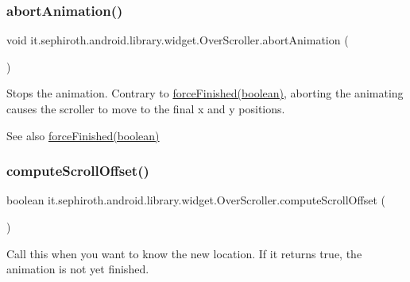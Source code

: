 \subsubsection{\texorpdfstring{abort\+Animation()}{abortAnimation()}}
{\footnotesize\ttfamily void it.\+sephiroth.\+android.\+library.\+widget.\+Over\+Scroller.\+abort\+Animation (\begin{DoxyParamCaption}{ }\end{DoxyParamCaption})}

Stops the animation. Contrary to \hyperlink{classit_1_1sephiroth_1_1android_1_1library_1_1widget_1_1_over_scroller_a9855d94ecbdd247fe61b7d1544e5f97e}{force\+Finished(boolean)}, aborting the animating causes the scroller to move to the final x and y positions.

\begin{DoxySeeAlso}{See also}
\hyperlink{classit_1_1sephiroth_1_1android_1_1library_1_1widget_1_1_over_scroller_a9855d94ecbdd247fe61b7d1544e5f97e}{force\+Finished(boolean)} 
\end{DoxySeeAlso}
\mbox{\label{classit_1_1sephiroth_1_1android_1_1library_1_1widget_1_1_over_scroller_ab45e11f2756ef6e2034cf2c99b67d1aa}} 
\subsubsection{\texorpdfstring{compute\+Scroll\+Offset()}{computeScrollOffset()}}
{\footnotesize\ttfamily boolean it.\+sephiroth.\+android.\+library.\+widget.\+Over\+Scroller.\+compute\+Scroll\+Offset (\begin{DoxyParamCaption}{ }\end{DoxyParamCaption})}

Call this when you want to know the new location. If it returns true, the animation is not yet finished. \mbox{\label{classit_1_1sephiroth_1_1android_1_1library_1_1widget_1_1_over_scroller_a94c0a3042a747b6212859cc06bf749d5}} 
